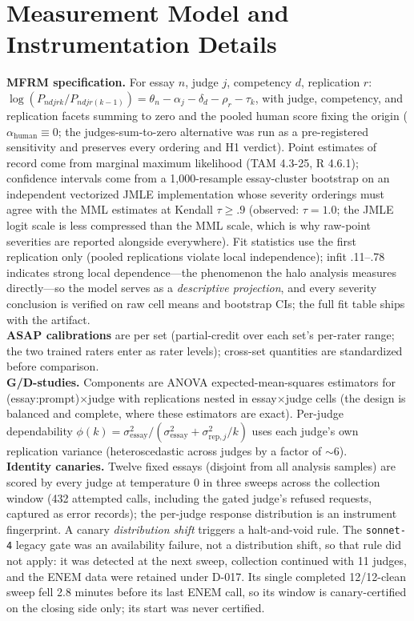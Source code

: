 \documentclass[fleqn,10pt]{JLA_article}
\begin{document}
\section{Measurement Model and Instrumentation Details}
\label{app:model}
\textbf{MFRM specification.} For essay $n$, judge $j$, competency $d$, replication $r$: $\log(P_{ndjrk}/P_{ndjr(k-1)}) = \theta_n - \alpha_j - \delta_d - \rho_r - \tau_k$, with judge, competency, and replication facets summing to zero and the pooled human score fixing the origin ($\alpha_{\text{human}} \equiv 0$; the judges-sum-to-zero alternative was run as a pre-registered sensitivity and preserves every ordering and H1 verdict). Point estimates of record come from marginal maximum likelihood (TAM 4.3-25, R 4.6.1); confidence intervals come from a 1{,}000-resample essay-cluster bootstrap on an independent vectorized JMLE implementation whose severity orderings must agree with the MML estimates at Kendall $\tau \geq .9$ (observed: $\tau = 1.0$; the JMLE logit scale is less compressed than the MML scale, which is why raw-point severities are reported alongside everywhere). Fit statistics use the first replication only (pooled replications violate local independence); infit .11--.78 indicates strong local dependence---the phenomenon the halo analysis measures directly---so the model serves as a \emph{descriptive projection}, and every severity conclusion is verified on raw cell means and bootstrap CIs; the full fit table ships with the artifact.\\[4pt]
\textbf{ASAP calibrations} are per set (partial-credit over each set's per-rater range; the two trained raters enter as rater levels); cross-set quantities are standardized before comparison.\\[4pt]
\textbf{G/D-studies.} Components are ANOVA expected-mean-squares estimators for (essay:prompt)$\times$judge with replications nested in essay$\times$judge cells (the design is balanced and complete, where these estimators are exact). Per-judge dependability $\phi(k) = \sigma^2_{\text{essay}}/(\sigma^2_{\text{essay}} + \sigma^2_{\text{rep},j}/k)$ uses each judge's own replication variance (heteroscedastic across judges by a factor of $\sim$6).\\[4pt]
\textbf{Identity canaries.} Twelve fixed essays (disjoint from all analysis samples) are scored by every judge at temperature 0 in three sweeps across the collection window (432 attempted calls, including the gated judge's refused requests, captured as error records); the per-judge response distribution is an instrument fingerprint. A canary \emph{distribution shift} triggers a halt-and-void rule. The \texttt{sonnet-4} legacy gate was an availability failure, not a distribution shift, so that rule did not apply: it was detected at the next sweep, collection continued with 11 judges, and the ENEM data were retained under D-017. Its single completed 12/12-clean sweep fell 2.8 minutes before its last ENEM call, so its window is canary-certified on the closing side only; its start was never certified.\\[4pt]
\end{document}
